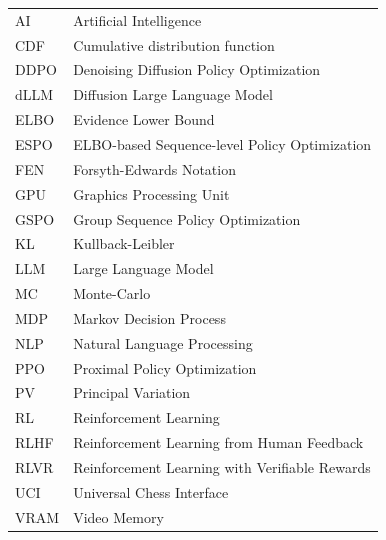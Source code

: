 \documentclass[english, 12pt, a4paper, sci, utf8, a-2b, online]{aaltothesis}
\theoremstyle{definition}
\theoremstyle{plain}
\theoremstyle{remark}
\begin{document}
\begin{tabular}{ll}
    AI   & Artificial Intelligence                        \\
    CDF  & Cumulative distribution function               \\
    DDPO & Denoising Diffusion Policy Optimization        \\
    dLLM & Diffusion Large Language Model                 \\
    ELBO & Evidence Lower Bound                           \\
    ESPO & ELBO-based Sequence-level Policy Optimization  \\
    FEN  & Forsyth-Edwards Notation                       \\
    GPU  & Graphics Processing Unit                       \\
    GSPO & Group Sequence Policy Optimization             \\
    KL   & Kullback-Leibler                               \\
    LLM  & Large Language Model                           \\
    MC   & Monte-Carlo                                    \\
    MDP  & Markov Decision Process                        \\
    NLP  & Natural Language Processing                    \\
    PPO  & Proximal Policy Optimization                   \\
    PV   & Principal Variation                            \\
    RL   & Reinforcement Learning                         \\
    RLHF & Reinforcement Learning from Human Feedback     \\
    RLVR & Reinforcement Learning with Verifiable Rewards \\
    UCI  & Universal Chess Interface                      \\
    VRAM & Video Memory
\end{tabular}
\end{document}
